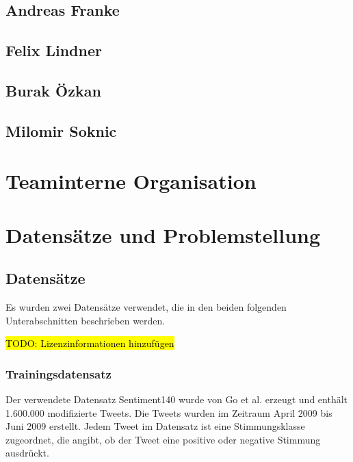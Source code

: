 \documentclass[researchlab,group,]{AIGpaper}
\newcommand{\redhl}{\sethlcolor{red}\hl}
\begin{document}
\subsection{Andreas Franke}
\subsection{Felix Lindner}
\subsection{Burak Özkan}
\subsection{Milomir Soknic}

\section{Teaminterne Organisation}

\section{Datensätze und Problemstellung}

\subsection{Datensätze}

Es wurden zwei Datensätze verwendet, die in den beiden folgenden Unterabschnitten beschrieben werden.

\redhl{TODO: Lizenzinformationen hinzufügen}

\subsubsection{Trainingsdatensatz}
Der verwendete Datensatz \glqq Sentiment140\grqq{} wurde von Go et al. \cite{go2009twitter} erzeugt und enthält 1.600.000 modifizierte Tweets.
Die Tweets wurden im Zeitraum April 2009 bis Juni 2009 erstellt.
Jedem Tweet im Datensatz ist eine Stimmungsklasse zugeordnet, die angibt, ob der Tweet eine positive oder negative Stimmung ausdrückt.
\end{document}
